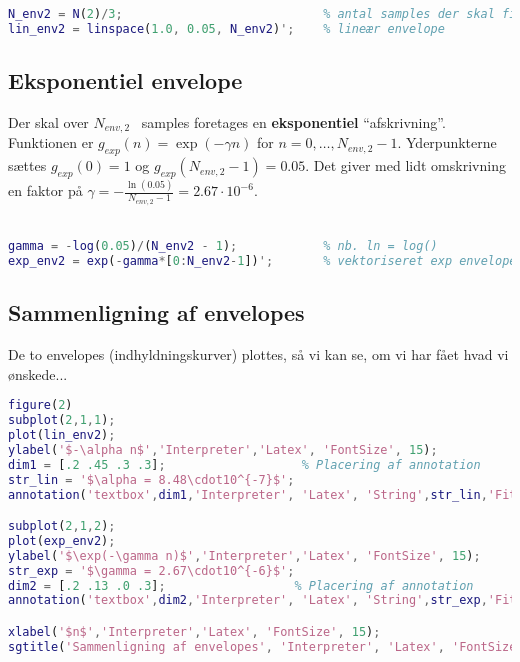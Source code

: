 \documentclass[a4paper]{report}
\begin{document}
\begin{lstlisting}[language=Matlab, style=Matlab-editor]
N_env2 = N(2)/3;                            % antal samples der skal filtr.
lin_env2 = linspace(1.0, 0.05, N_env2)';    % lineær envelope
\end{lstlisting}
\begin{par}
\subsection{Eksponentiel envelope}
\end{par} 
\begin{par}

Der skal over $N_{env,2}$~ samples foretages en \textbf{eksponentiel} ``afskrivning''.
Funktionen er $g_{exp}(n) = \exp(-\gamma n)$ for $n=0,\ldots,N_{env,2}-1$.
Yderpunkterne sættes $g_{exp}(0) = 1$ og $g_{exp}(N_{env,2}-1) = 0.05$.
Det giver med lidt omskrivning en faktor på $ \gamma = -\frac{\ln(0.05)}{N_{env,2}-1}=2.67\cdot 10^{-6}$.\\\\

\end{par} 

\begin{lstlisting}[language=Matlab, style=Matlab-editor]
gamma = -log(0.05)/(N_env2 - 1);            % nb. ln = log()
exp_env2 = exp(-gamma*[0:N_env2-1])';       % vektoriseret exp envelope
\end{lstlisting}
\begin{par}
\subsection{Sammenligning af envelopes}
\end{par} 
\begin{par}

De to envelopes (indhyldningskurver) plottes, så vi kan se, om vi har
fået hvad vi ønskede...\\

\end{par} 

\begin{lstlisting}[language=Matlab, style=Matlab-editor]
figure(2)
subplot(2,1,1);
plot(lin_env2);
ylabel('$-\alpha n$','Interpreter','Latex', 'FontSize', 15);
dim1 = [.2 .45 .3 .3];                   % Placering af annotation
str_lin = '$\alpha = 8.48\cdot10^{-7}$';
annotation('textbox',dim1,'Interpreter', 'Latex', 'String',str_lin,'FitBoxToText','on', 'FontSize', 15);

subplot(2,1,2);
plot(exp_env2);
ylabel('$\exp(-\gamma n)$','Interpreter','Latex', 'FontSize', 15);
str_exp = '$\gamma = 2.67\cdot10^{-6}$';
dim2 = [.2 .13 .0 .3];                  % Placering af annotation
annotation('textbox',dim2,'Interpreter', 'Latex', 'String',str_exp,'FitBoxToText','on', 'FontSize', 15);

xlabel('$n$','Interpreter','Latex', 'FontSize', 15);
sgtitle('Sammenligning af envelopes', 'Interpreter', 'Latex', 'FontSize', 20);
\end{lstlisting}
\end{document}
